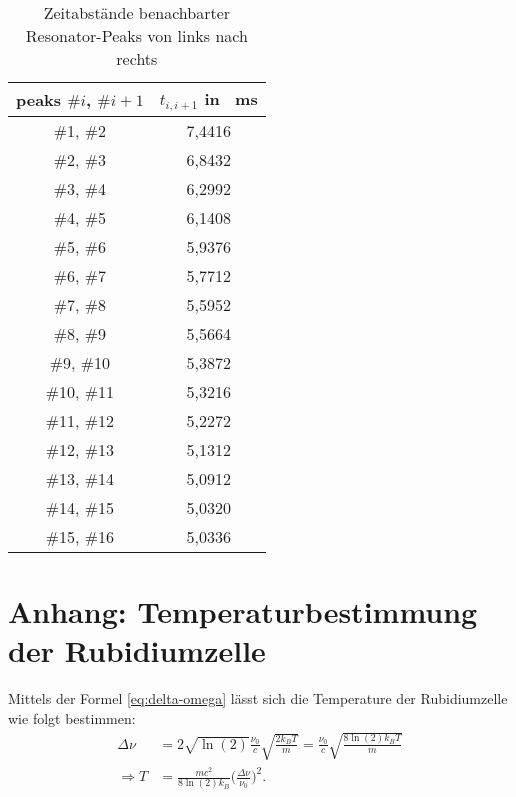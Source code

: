\begin{appendix}
\begin{table}[!h]
    \centering
    \begin{tabular}{|c|c|}
        \hline
         peaks  $\#i$, $\#i+1$    &   $t_{i, i+1}$ in \SI{}{\milli \second} \\
         \hline
         \hline
         \#1, \#2    &   7,4416         \\
         \hline
         \#2, \#3    &   6,8432         \\
         \hline
         \#3, \#4    &   6,2992         \\
         \hline
         \#4, \#5    &   6,1408         \\
         \hline
         \#5, \#6    &   5,9376         \\
         \hline
         \#6, \#7    &   5,7712         \\
         \hline
         \#7, \#8    &   5,5952         \\
         \hline
         \#8, \#9    &   5,5664         \\
         \hline
         \#9, \#10   &   5,3872         \\
         \hline
         \#10, \#11  &   5,3216         \\
         \hline
         \#11, \#12  &   5,2272         \\
         \hline
         \#12, \#13  &   5,1312         \\
         \hline
         \#13, \#14  &   5,0912         \\
         \hline
         \#14, \#15  &   5,0320         \\
         \hline
         \#15, \#16  &   5,0336         \\
         \hline
    \end{tabular}
    \caption{Zeitabstände benachbarter Resonator-Peaks von links nach rechts}
    \label{tab:time-distances}
\end{table}

\cleardoublepage{}


\chapter{Anhang: Temperaturbestimmung der Rubidiumzelle}
\label{app:temperature}

Mittels der Formel \eqref{eq:delta-omega} lässt sich die Temperature der Rubidiumzelle wie folgt bestimmen:
\begin{align*}
    \Delta \nu &= 2 \sqrt{\ln(2)} \frac{\nu_{0}}{c} \sqrt{\frac{2 k_{B} T}{m}} = \frac{\nu_{0}}{c} \sqrt{\frac{8 \ln(2) k_{B} T}{m}} \\
    \Rightarrow T &= \frac{m c^2}{8 \ln(2) k_{B}} \biggl(\frac{\Delta \nu}{\nu_{0}} \biggr)^2.
\end{align*}


\end{appendix}
